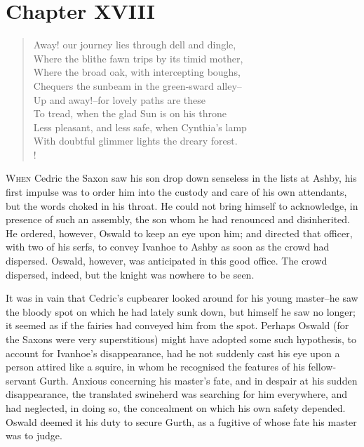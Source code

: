 \chapter{Chapter XVIII}

\begin{verse}
Away! our journey lies through dell and dingle,\\
Where the blithe fawn trips by its timid mother,\\
Where the broad oak, with intercepting boughs,\\
Chequers the sunbeam in the green-sward alley--\\
Up and away!--for lovely paths are these\\
To tread, when the glad Sun is on his throne\\
Less pleasant, and less safe, when Cynthia's lamp\\
With doubtful glimmer lights the dreary forest.\\!
\end{verse}

\lettrine{W}{hen} Cedric the Saxon saw his son drop down senseless in
the lists at
Ashby, his first impulse was to order him into the custody and care of
his own attendants, but the words choked in his throat. He could not
bring himself to acknowledge, in presence of such an assembly, the son
whom he had renounced and disinherited. He ordered, however, Oswald to
keep an eye upon him; and directed that officer, with two of his serfs,
to convey Ivanhoe to Ashby as soon as the crowd had dispersed. Oswald,
however, was anticipated in this good office. The crowd dispersed,
indeed, but the knight was nowhere to be seen.

It was in vain that Cedric's cupbearer looked around for his young
master--he saw the bloody spot on which he had lately sunk down, but
himself he saw no longer; it seemed as if the fairies had conveyed him
from the spot. Perhaps Oswald (for the Saxons were very superstitious)
might have adopted some such hypothesis, to account for Ivanhoe's
disappearance, had he not suddenly cast his eye upon a person attired
like a squire, in whom he recognised the features of his fellow-servant
Gurth. Anxious concerning his master's fate, and in despair at his
sudden disappearance, the translated swineherd was searching for him
everywhere, and had neglected, in doing so, the concealment on which his
own safety depended. Oswald deemed it his duty to secure Gurth, as a
fugitive of whose fate his master was to judge.


